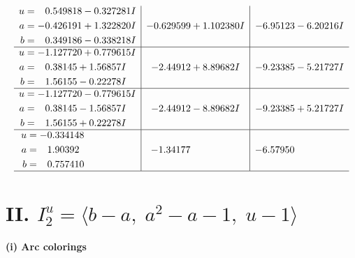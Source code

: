 \documentclass[1p]{elsarticle_modified}
\theoremstyle{definition}
\begin{document}
$$\begin{array}{c|c|c}
\begin{aligned}
u &= \phantom{-}0.549818 - 0.327281 I \\
a &= -0.426191 + 1.322820 I \\
b &= \phantom{-}0.349186 - 0.338218 I\end{aligned}
 & -0.629599 + 1.102380 I & -6.95123 - 6.20216 I \\ \hline\begin{aligned}
u &= -1.127720 + 0.779615 I \\
a &= \phantom{-}0.38145 + 1.56857 I \\
b &= \phantom{-}1.56155 - 0.22278 I\end{aligned}
 & -2.44912 + 8.89682 I & -9.23385 - 5.21727 I \\ \hline\begin{aligned}
u &= -1.127720 - 0.779615 I \\
a &= \phantom{-}0.38145 - 1.56857 I \\
b &= \phantom{-}1.56155 + 0.22278 I\end{aligned}
 & -2.44912 - 8.89682 I & -9.23385 + 5.21727 I \\ \hline\begin{aligned}
u &= -0.334148\phantom{ +0.000000I} \\
a &= \phantom{-}1.90392\phantom{ +0.000000I} \\
b &= \phantom{-}0.757410\phantom{ +0.000000I}\end{aligned}
 & -1.34177\phantom{ +0.000000I} & -6.57950\phantom{ +0.000000I}\\
 \hline 
 \end{array}$$\newpage\newpage\renewcommand{\arraystretch}{1}
\centering \section*{II. $I^u_{2}= \langle b- a,\;a^2- a-1,\;u-1 \rangle$}
\flushleft \textbf{(i) Arc colorings}\\
\end{document}
